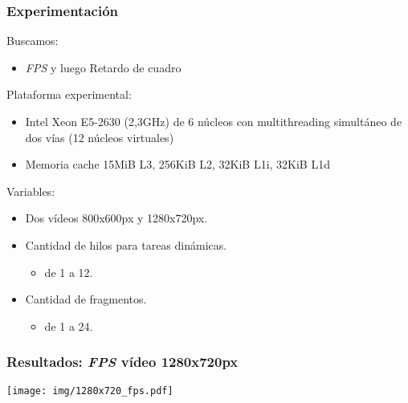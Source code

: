 \documentclass[11pt,a4paper,spanish]{beamer}
\begin{document}
\begin{frame}

\frametitle{Experimentación}

Buscamos:

\begin{itemize}

	\item \emph{FPS} y luego Retardo de cuadro

\end{itemize}

Plataforma experimental:

\begin{itemize}

	\item Intel Xeon E5-2630 (2,3GHz) de 6 núcleos con multithreading
		simultáneo de dos vías (12 núcleos virtuales)

	\item Memoria cache 15MiB L3, 256KiB L2, 32KiB L1i, 32KiB L1d

\end{itemize}

Variables:

\begin{itemize}

        \item Dos vídeos 800x600px y 1280x720px.

        \item Cantidad de hilos para tareas dinámicas.

	\begin{itemize}

        \item de 1 a 12.

	\end{itemize}

	\item Cantidad de fragmentos.

	\begin{itemize}

        	\item de 1 a 24.

	\end{itemize}

\end{itemize}

\end{frame}

\begin{frame}

\frametitle{Resultados: \emph{FPS} vídeo 1280x720px}

\texttt{[image: img/1280x720\_fps.pdf]}

\end{frame}
\end{document}

